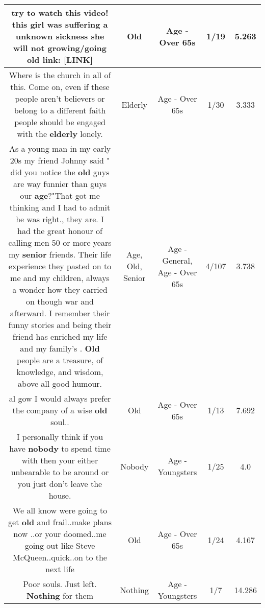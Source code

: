 \documentclass[11pt]{article}
\newlength\mylength
\begin{document}
\begin{center}
\begin{longtable}{|C{.65\mylength}|C{.30\mylength}|C{.12\mylength}|C{.12\mylength}|C{.12\mylength}|}
  \small try to watch this video! this girl was suffering a unknown sickness she will not growing/going \textbf{old} link:  [LINK] \normalsize   & Old & Age - Over 65s & 1/19 & 5.263 \\  \hline
  \small Where is the church in all of this. Come on, even if these people aren't believers or belong to a different faith people should be engaged with the \textbf{elderly} lonely.\normalsize   & Elderly & Age - Over 65s & 1/30 & 3.333 \\  \hline
  \small As a young man in my early 20s my friend Johnny said " did you notice the \textbf{old} guys are way funnier than guys our \textbf{age}?"That got me thinking and I had to admit he was right., they are. I had the great honour of calling men 50 or more years my \textbf{senior} friends. Their life experience they pasted on to me and my children, always a wonder how they carried on though war and afterward. I remember their funny stories and being their friend has enriched my life and my family's . \textbf{Old} people are a treasure, of knowledge, and wisdom, above all good humour.\normalsize   & Age, Old, Senior & Age - General, Age - Over 65s & 4/107 & 3.738 \\  \hline
  \small al gow I would always prefer the company of a wise \textbf{old} soul..\normalsize   & Old & Age - Over 65s & 1/13 & 7.692 \\  \hline
  \small I personally think if you have \textbf{nobody} to spend time with then your either unbearable to be around or you just don't leave the house.\normalsize   & Nobody & Age - Youngsters & 1/25 & 4.0 \\  \hline
  \small We all know were going to get \textbf{old} and frail..make plans now ..or your doomed..me  going out like Steve McQueen..quick..on to the next life\normalsize   & Old & Age - Over 65s & 1/24 & 4.167 \\  \hline
  \small Poor souls. Just left. \textbf{Nothing} for them\normalsize   & Nothing & Age - Youngsters & 1/7 & 14.286 \\  \hline

\end{longtable}
\end{center}
\end{document}
